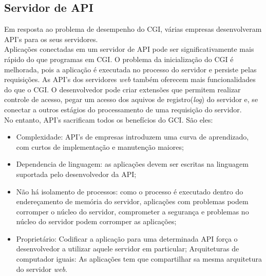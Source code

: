 \subsection{Servidor de API}
Em resposta ao problema de desempenho do CGI, várias empresas desenvolveram API's para os seus servidores.\\
Aplicações conectadas em um servidor de API pode ser significativamente mais rápido do que programas em CGI. O problema da inicialização do CGI é melhorada, pois a aplicação é executada no processo do servidor e persiste pelas requisições. As API's dos servidores \textit{web} também oferecem mais funcionalidades do que o CGI. O desenvolvedor pode criar extensões que permitem realizar controle de acesso, pegar um acesso dos aquivos de registro(\textit{log}) do servidor e, se conectar a outros estágios do processamento de uma requisição do servidor.\\
No entanto, API's sacrificam todos os benefícios do GCI. São eles:
\begin{itemize}
	\item Complexidade: API's de empresas introduzem uma curva de aprendizado, com curtos de implementação e manutenção maiores;
	\item Dependencia de linguagem: as aplicações devem ser escritas na linguagem suportada pelo desenvolvedor da API;
	\item Não há isolamento de processos: como o processo é executado dentro do endereçamento de memória do servidor, aplicações com problemas podem corromper o núcleo do servidor, comprometer a segurança e problemas no núcleo do servidor podem corromper as aplicações;
	\item Proprietário: Codificar a aplicação para uma determinada API força o desenvolvedor a utilizar aquele servidor em particular;
	Arquiteturas de computador iguais: As aplicações tem que compartilhar sa mesma arquitetura do servidor \textit{web}.
\end{itemize}
